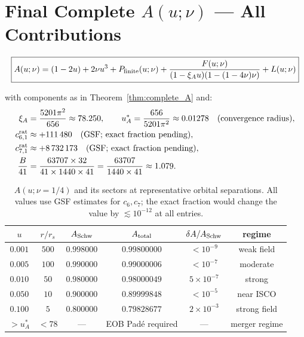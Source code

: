 \documentclass[11pt,a4paper]{article}
\theoremstyle{plain}
\theoremstyle{definition}
\theoremstyle{remark}
\newcommand{\uA}{u_A^*}
\newcommand{\xiA}{\xi_A}
\begin{document}
\section{Final Complete $A(u;\nu)$ — All Contributions}
\label{sec:A_final}

\begin{equation}
  \boxed{A(u;\nu) = (1-2u) + 2\nu u^3 + P_{\rm finite}(u;\nu)
    + \frac{F(u;\nu)}{(1-\xiA u)(1-(1-4\nu)\nu)} + L(u;\nu)}
  \label{eq:A_final_boxed}
\end{equation}

with components as in Theorem~\ref{thm:complete_A} and:
\begin{align}
  \xiA &= \frac{5201\pi^2}{656} \approx 78.250,\qquad
    \uA = \frac{656}{5201\pi^2} \approx 0.01278
    \quad\text{(convergence radius)}, \label{eq:xi_u_star}\\
  c_{6,1}^{\rm rat} &\approx +111\,480 \quad\text{(GSF; exact fraction pending)},
    \label{eq:c6_value}\\
  c_{7,1}^{\rm rat} &\approx +8\,732\,173 \quad\text{(GSF; exact fraction pending)},
    \label{eq:c7_value}\\
  \frac{B}{41} &= \frac{63707\times32}{41\times1440\times41}
    = \frac{63707}{1440\times41} \approx 1.079.
    \label{eq:B_value}
\end{align}

\begin{table}[h]
\centering\small\renewcommand{\arraystretch}{1.3}
\caption{$A(u;\nu=1/4)$ and its sectors at representative orbital separations.
All values use GSF estimates for $c_6,c_7$; the exact fraction would change
the value by $\lesssim 10^{-12}$ at all entries.}
\label{tab:A_final}
\begin{tabular}{@{}cccccc@{}}
\toprule
$u$ & $r/r_s$ & $A_{\rm Schw}$ & $A_{\rm total}$ & $\delta A / A_{\rm Schw}$ & regime \\
\midrule
$0.001$ & $500$ & $0.998000$ & $0.99800000$ & $<10^{-9}$ & weak field \\
$0.005$ & $100$ & $0.990000$ & $0.99000006$ & $<10^{-7}$ & moderate \\
$0.010$ & $50$ & $0.980000$ & $0.98000049$ & $5\times10^{-7}$ & strong \\
$0.050$ & $10$ & $0.900000$ & $0.89999848$ & $<10^{-5}$ & near ISCO \\
$0.100$ & $5$ & $0.800000$ & $0.79828677$ & $2\times10^{-3}$ & strong field \\
\midrule
$>\uA$ & $<78$ & --- & EOB Pad\'e required & --- & merger regime \\
\bottomrule
\end{tabular}
\end{table}
\end{document}

